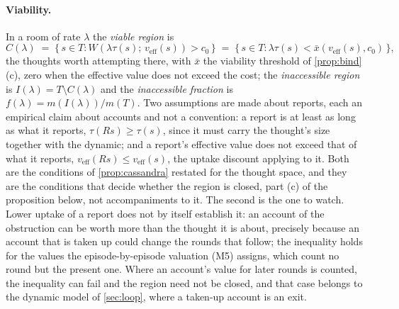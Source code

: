 \paragraph{Viability.} In a room of rate $\lambda$ the \emph{viable region} is
\[
C(\lambda) \;=\; \{\, s \in T : W(\lambda\tau(s);\, v_{\mathrm{eff}}(s)) > c_0 \,\} \;=\; \{\, s \in T : \lambda\tau(s) < \bar{x}(v_{\mathrm{eff}}(s), c_0) \,\},
\]
the thoughts worth attempting there, with $\bar{x}$ the viability threshold of \autoref{prop:bind}(c), zero when the effective value does not exceed the cost; the \emph{inaccessible region} is $I(\lambda) = T \setminus C(\lambda)$ and the \emph{inaccessible fraction} is $f(\lambda) = m(I(\lambda))/m(T)$. Two assumptions are made about reports, each an empirical claim about accounts and not a convention: a report is at least as long as what it reports, $\tau(Rs) \ge \tau(s)$, since it must carry the thought's size together with the dynamic; and a report's effective value does not exceed that of what it reports, $v_{\mathrm{eff}}(Rs) \le v_{\mathrm{eff}}(s)$, the uptake discount applying to it. Both are the conditions of \autoref{prop:cassandra} restated for the thought space, and they are the conditions that decide whether the region is closed, part (c) of the proposition below, not accompaniments to it. The second is the one to watch. Lower uptake of a report does not by itself establish it: an account of the obstruction can be worth more than the thought it is about, precisely because an account that is taken up could change the rounds that follow; the inequality holds for the values the episode-by-episode valuation (M5) assigns, which count no round but the present one. Where an account's value for later rounds is counted, the inequality can fail and the region need not be closed, and that case belongs to the dynamic model of \autoref{sec:loop}, where a taken-up account is an exit.


